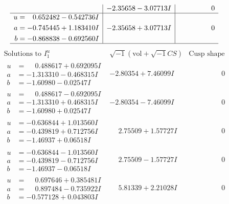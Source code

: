 \documentclass[1p]{elsarticle_modified}
\theoremstyle{definition}
\newcommand{\I}{\sqrt{-1}}
\begin{document}
$$\begin{array}{c|c|c}
 & -2.35658 - 3.07713 I & \phantom{-0.000000 } 0 \\ \hline\begin{aligned}
u &= \phantom{-}0.652482 - 0.542736 I \\
a &= -0.745445 + 1.183410 I \\
b &= -0.868838 - 0.692560 I\end{aligned}
 & -2.35658 + 3.07713 I & \phantom{-0.000000 } 0\\
 \hline 
 \end{array}$$\newpage$$\begin{array}{c|c|c}  
\text{Solutions to }I^u_{1}& \I (\text{vol} + \sqrt{-1}CS) & \text{Cusp shape}\\
 \hline 
\begin{aligned}
u &= \phantom{-}0.488617 + 0.692095 I \\
a &= -1.313310 - 0.468315 I \\
b &= -1.60980 - 0.02547 I\end{aligned}
 & -2.80354 + 7.46099 I & \phantom{-0.000000 } 0 \\ \hline\begin{aligned}
u &= \phantom{-}0.488617 - 0.692095 I \\
a &= -1.313310 + 0.468315 I \\
b &= -1.60980 + 0.02547 I\end{aligned}
 & -2.80354 - 7.46099 I & \phantom{-0.000000 } 0 \\ \hline\begin{aligned}
u &= -0.636844 + 1.013560 I \\
a &= -0.439819 + 0.712756 I \\
b &= -1.46937 + 0.06518 I\end{aligned}
 & \phantom{-}2.75509 + 1.57727 I & \phantom{-0.000000 } 0 \\ \hline\begin{aligned}
u &= -0.636844 - 1.013560 I \\
a &= -0.439819 - 0.712756 I \\
b &= -1.46937 - 0.06518 I\end{aligned}
 & \phantom{-}2.75509 - 1.57727 I & \phantom{-0.000000 } 0 \\ \hline\begin{aligned}
u &= \phantom{-}0.697646 + 0.385481 I \\
a &= \phantom{-}0.897484 - 0.735922 I \\
b &= -0.577128 + 0.043803 I\end{aligned}
 & \phantom{-}5.81339 + 2.21028 I & \phantom{-0.000000 } 0 \\ \hline\begin{aligned}

\end{aligned}
\end{array}$$
\end{document}
